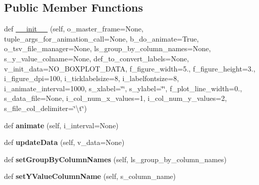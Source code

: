 \subsection*{Public Member Functions}
\begin{DoxyCompactItemize}
\item 
def \hyperlink{classnegui_1_1pgplottingframe_1_1PGPlottingFrameBoxplotFromFileManager_a1485197b57dfbe589dce3ae7ab31d91b}{\+\_\+\+\_\+init\+\_\+\+\_\+} (self, o\+\_\+master\+\_\+frame=None, tuple\+\_\+args\+\_\+for\+\_\+animation\+\_\+call=None, b\+\_\+do\+\_\+animate=True, o\+\_\+tsv\+\_\+file\+\_\+manager=None, ls\+\_\+group\+\_\+by\+\_\+column\+\_\+names=None, s\+\_\+y\+\_\+value\+\_\+colname=None, def\+\_\+to\+\_\+convert\+\_\+labels=None, v\+\_\+init\+\_\+data=N\+O\+\_\+\+B\+O\+X\+P\+L\+O\+T\+\_\+\+D\+A\+TA, f\+\_\+figure\+\_\+width=5., f\+\_\+figure\+\_\+height=3., i\+\_\+figure\+\_\+dpi=100, i\+\_\+ticklabelsize=8, i\+\_\+labelfontsize=8, i\+\_\+animate\+\_\+interval=1000, s\+\_\+xlabel=\char`\"{}\char`\"{}, s\+\_\+ylabel=\char`\"{}\char`\"{}, f\+\_\+plot\+\_\+line\+\_\+width=0., s\+\_\+data\+\_\+file=None, i\+\_\+col\+\_\+num\+\_\+x\+\_\+values=1, i\+\_\+col\+\_\+num\+\_\+y\+\_\+values=2, s\+\_\+file\+\_\+col\+\_\+delimiter=\char`\"{}\textbackslash{}t\char`\"{})
\item 
def {\bfseries animate} (self, i\+\_\+interval=None)\hypertarget{classnegui_1_1pgplottingframe_1_1PGPlottingFrameBoxplotFromFileManager_abdd7079a1184c9cb7a8d3573ff489cc0}{}\label{classnegui_1_1pgplottingframe_1_1PGPlottingFrameBoxplotFromFileManager_abdd7079a1184c9cb7a8d3573ff489cc0}

\item 
def {\bfseries update\+Data} (self, v\+\_\+data=None)\hypertarget{classnegui_1_1pgplottingframe_1_1PGPlottingFrameBoxplotFromFileManager_a532e24a7d9c775ebe5b27b5ce621ab5c}{}\label{classnegui_1_1pgplottingframe_1_1PGPlottingFrameBoxplotFromFileManager_a532e24a7d9c775ebe5b27b5ce621ab5c}

\item 
def {\bfseries set\+Group\+By\+Column\+Names} (self, ls\+\_\+group\+\_\+by\+\_\+column\+\_\+names)\hypertarget{classnegui_1_1pgplottingframe_1_1PGPlottingFrameBoxplotFromFileManager_abec814036564756698f255482f935973}{}\label{classnegui_1_1pgplottingframe_1_1PGPlottingFrameBoxplotFromFileManager_abec814036564756698f255482f935973}

\item 
def {\bfseries set\+Y\+Value\+Column\+Name} (self, s\+\_\+column\+\_\+name)\hypertarget{classnegui_1_1pgplottingframe_1_1PGPlottingFrameBoxplotFromFileManager_aded89b588b0b36ff78b37e476477dbe8}{}\label{classnegui_1_1pgplottingframe_1_1PGPlottingFrameBoxplotFromFileManager_aded89b588b0b36ff78b37e476477dbe8}

\end{DoxyCompactItemize}
